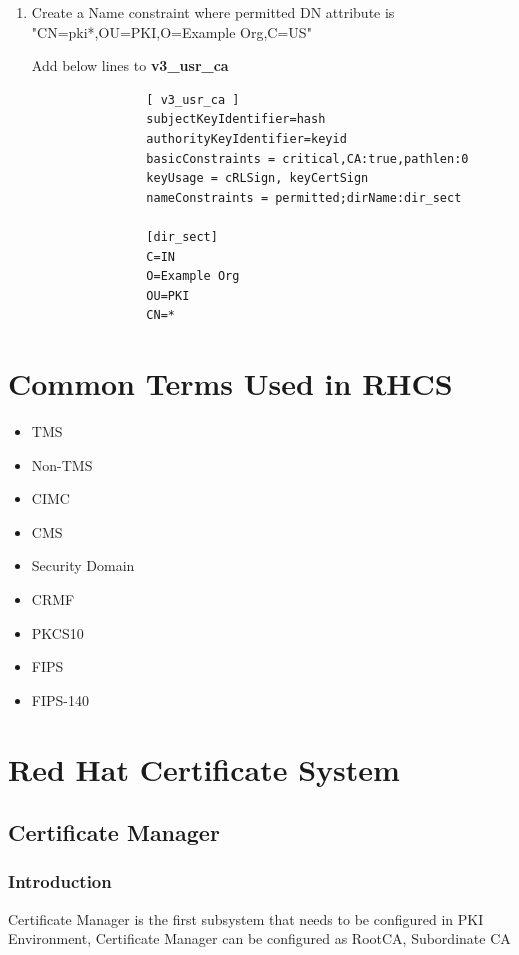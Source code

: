 \documentclass[a4paper]{article}
\begin{document}
\begin{enumerate}[label*=\arabic*.]
        Add below line to \textbf{server\_cert} section and create a new section \textbf{alt\_names}
        \begin{lstlisting}
             [ server_cert ]
             subjectAltName = @alt_names

            [alt_names]
            DNS.1 = *.example.org
       \end{lstlisting}

        \item Create a Name constraint where permitted DN attribute is "CN=pki*,OU=PKI,O=Example Org,C=US"

            Add below lines to \textbf{v3\_usr\_ca} 
            \begin{lstlisting}
                [ v3_usr_ca ]
                subjectKeyIdentifier=hash
                authorityKeyIdentifier=keyid
                basicConstraints = critical,CA:true,pathlen:0
                keyUsage = cRLSign, keyCertSign
                nameConstraints = permitted;dirName:dir_sect

                [dir_sect]
                C=IN
                O=Example Org
                OU=PKI
                CN=*
            \end{lstlisting}
\end{enumerate}
\section{Common Terms Used in RHCS}
\begin{itemize}
    \item TMS
    \item Non-TMS
    \item CIMC
    \item CMS
    \item Security Domain
    \item CRMF
    \item PKCS10
    \item FIPS
    \item FIPS-140
\end{itemize}
\section{Red Hat Certificate System}
\subsection{Certificate Manager}
\subsubsection{Introduction}
Certificate Manager is the first subsystem that needs to be configured in PKI Environment, Certificate Manager can be configured as RootCA, Subordinate CA
\end{document}
